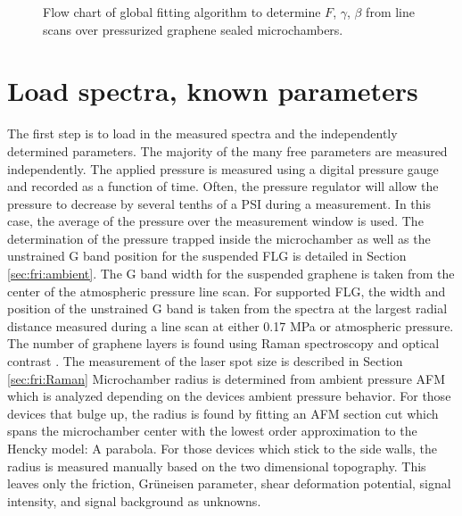 \begin{figure}
	\begin{center}
	
	\end{center}
	\caption[Flow chart of global fitting algorithm]{\label{fig:Fit:Flow}Flow chart of global fitting algorithm to determine $F$, $\gamma$, $\beta$ from line scans over pressurized graphene sealed microchambers.}
\end{figure}

\section*{Load spectra, known parameters}
The first step is to load in the measured spectra and the independently determined parameters.
The majority of the many free parameters are measured independently.
The applied pressure is measured using a digital pressure gauge and recorded as a function of time.
Often, the pressure regulator will allow the pressure to decrease by several tenths of a PSI during a measurement.
In this case, the average of the pressure over the measurement window is used.
The determination of the pressure trapped inside the microchamber as well as the unstrained G band position for the suspended FLG is detailed in Section \ref{sec:fri:ambient}.
The G band width for the suspended graphene is taken from the center of the atmospheric pressure line scan.
For supported FLG, the width and position of the unstrained G band is taken from the spectra at the largest radial distance measured during a line scan at either 0.17 MPa or atmospheric pressure.
The number of graphene layers is found using Raman spectroscopy \cite{Ferrari2006} and optical contrast \cite{Blake2007,Casiraghi2007a}.
The measurement of the laser spot size is described in Section \ref{sec:fri:Raman}
Microchamber radius is determined from ambient pressure AFM which is analyzed depending on the devices ambient pressure behavior.
For those devices that bulge up, the radius is found by fitting an AFM section cut which spans the microchamber center with the lowest order approximation to the Hencky model: A parabola.
For those devices which stick to the side walls, the radius is measured manually based on the two dimensional topography.
This leaves only the friction, Gr\"{u}neisen parameter, shear deformation potential, signal intensity, and signal background as unknowns.

